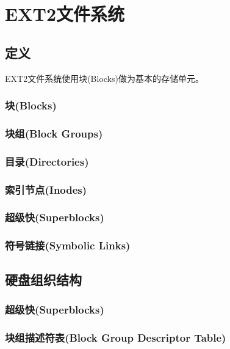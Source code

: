 \chapter{EXT2文件系统}




\section{定义}

EXT2文件系统使用块(Blocks)做为基本的存储单元。

\subsection{块(Blocks)}
\subsection{块组(Block Groups)}
\subsection{目录(Directories)}
\subsection{索引节点(Inodes)}
\subsection{超级快(Superblocks)}
\subsection{符号链接(Symbolic Links)}

\section{硬盘组织结构}

\subsection{超级快(Superblocks)}

\subsection{块组描述符表(Block Group Descriptor Table)}

